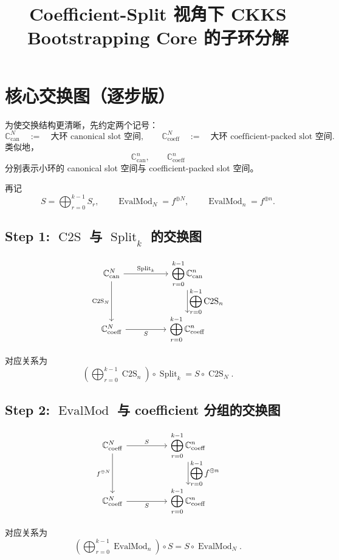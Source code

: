 \documentclass[UTF8,11pt]{ctexart}
\title{Coefficient-Split 视角下 CKKS Bootstrapping Core 的子环分解}
\author{}
\date{}
\theoremstyle{definition}
\newcommand{\CtwoS}{\operatorname{C2S}}
\newcommand{\Split}{\operatorname{Split}}
\newcommand{\EvalMod}{\operatorname{EvalMod}}
\begin{document}
\section{核心交换图（逐步版）}

为使交换结构更清晰，先约定两个记号：
\[
\mathbb{C}^{N}_{\mathrm{can}}
\quad:=\quad
\text{大环 canonical slot 空间},
\qquad
\mathbb{C}^{N}_{\mathrm{coeff}}
\quad:=\quad
\text{大环 coefficient-packed slot 空间}.
\]
类似地，
\[
\mathbb{C}^{n}_{\mathrm{can}},
\qquad
\mathbb{C}^{n}_{\mathrm{coeff}}
\]
分别表示小环的 canonical slot 空间与 coefficient-packed slot 空间。

再记
\[
S=\bigoplus_{r=0}^{k-1}S_r,
\qquad
\EvalMod_N=f^{\oplus N},
\qquad
\EvalMod_n=f^{\oplus n}.
\]

\subsection*{Step 1: \(\CtwoS\) 与 \(\Split_k\) 的交换图}

\[
\begin{tikzcd}[column sep=huge,row sep=large]
\mathbb{C}^{N}_{\mathrm{can}}
    \arrow[r,"\Split_k"]
    \arrow[d,"\CtwoS_N"']
&
\displaystyle\bigoplus_{r=0}^{k-1}\mathbb{C}^{n}_{\mathrm{can}}
    \arrow[d,"\displaystyle\bigoplus_{r=0}^{k-1}\CtwoS_n"]
\\
\mathbb{C}^{N}_{\mathrm{coeff}}
    \arrow[r,"S"']
&
\displaystyle\bigoplus_{r=0}^{k-1}\mathbb{C}^{n}_{\mathrm{coeff}}
\end{tikzcd}
\]

对应关系为
\[
\boxed{
\left(\bigoplus_{r=0}^{k-1}\CtwoS_n\right)\circ \Split_k
=
S\circ \CtwoS_N.
}
\]

\subsection*{Step 2: \(\EvalMod\) 与 coefficient 分组的交换图}

\[
\begin{tikzcd}[column sep=huge,row sep=large]
\mathbb{C}^{N}_{\mathrm{coeff}}
    \arrow[r,"S"]
    \arrow[d,"f^{\oplus N}"']
&
\displaystyle\bigoplus_{r=0}^{k-1}\mathbb{C}^{n}_{\mathrm{coeff}}
    \arrow[d,"\displaystyle\bigoplus_{r=0}^{k-1}f^{\oplus n}"]
\\
\mathbb{C}^{N}_{\mathrm{coeff}}
    \arrow[r,"S"']
&
\displaystyle\bigoplus_{r=0}^{k-1}\mathbb{C}^{n}_{\mathrm{coeff}}
\end{tikzcd}
\]

对应关系为
\[
\boxed{
\left(\bigoplus_{r=0}^{k-1}\EvalMod_n\right)\circ S
=
S\circ \EvalMod_N.
}
\]
\end{document}
